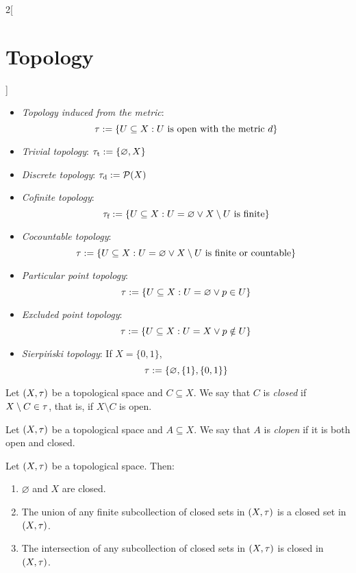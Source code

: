 \documentclass[../../../main.tex]{subfiles}
\begin{document}
\begin{multicols}{2}[\section{Topology}]
\begin{prop}
\begin{itemize}
      \item \emph{Topology induced from the metric}: $$\tau:=\{U\subseteq X:U\text{ is open with the metric }d\}$$
      \item \emph{Trivial topology}: $\tau_\text{t}:=\{\varnothing,X\}$
      \item \emph{Discrete topology}: $\tau_\text{d}:=\mathcal{P}(X)$
      \item \emph{Cofinite topology}: $$\tau_\text{f}:=\{U\subseteq X:U=\varnothing\lor X\setminus U\text{ is finite}\}$$
      \item \emph{Cocountable topology}:
            \begin{equation*}
              \tau:=\{U\subseteq X:U=\varnothing\lor X\setminus U\text{ is finite or countable}\}
            \end{equation*}
      \item \emph{Particular point topology}: $$\tau:=\{U\subseteq X:U=\varnothing\lor p\in U\}$$
      \item \emph{Excluded point topology}: $$\tau:=\{U\subseteq X:U=X\lor p\notin U\}$$
      \item \emph{Sierpiński topology}: If $X=\{0,1\}$, $$\tau:=\{\varnothing,\{1\},\{0,1\}\}$$
    \end{itemize}
  \end{prop}
  \begin{definition}
    Let $(X,\tau)$ be a topological space and $C\subseteq X$. We say that $C$ is \emph{closed} if $X\setminus C\in\tau$, that is, if $X\setminus C$ is open.
  \end{definition}
  \begin{definition}
    Let $(X,\tau)$ be a topological space and $A\subseteq X$. We say that $A$ is \emph{clopen} if it is both open and closed.
  \end{definition}
  \begin{prop}
    Let $(X,\tau)$ be a topological space. Then:
    \begin{enumerate}
      \item $\varnothing$ and $X$ are closed.
      \item The union of any finite subcollection of closed sets in $(X,\tau)$ is a closed set in $(X,\tau)$.
      \item The intersection of any subcollection of closed sets in $(X,\tau)$ is closed in $(X,\tau)$.
    \end{enumerate}
  \end{prop}

\end{multicols}
\end{document}

